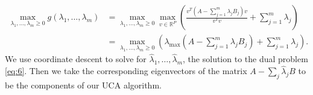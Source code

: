 \documentclass[12pt]{article}
\begin{document}
\begin{align}
    \max_{\lambda_1,\ldots,\lambda_m \geq 0}{g(\lambda_1, \ldots, \lambda_m)} %
   &=\max_{\lambda_1,\ldots,\lambda_m \geq 0}{\max_{v \in \mathbb{R}^P}{\left(\frac{v^T\left(A - \sum^{m}_{j = 1}{\lambda_j B_j}\right)v}{v^T v} + \sum^{m}_{j=1}{\lambda_j}\right)}}\nonumber \\
   &=\max_{\lambda_1,\ldots,\lambda_m \geq 0}{\left(\lambda_{\text{max}}\left(A - \sum^{m}_{j = 1}{\lambda_j B_j}\right) + \sum^{m}_{j=1}{\lambda_j}\right)}.\label{eq:6}
\end{align}
We use coordinate descent to solve for $\hat{\lambda}_1, \ldots, \hat{\lambda}_m$, the solution to the dual problem \eqref{eq:6}. Then we take the corresponding eigenvectors of the matrix  $A - \sum_j \hat{\lambda}_j B$ to be the components of our UCA algorithm. 
\end{document}
